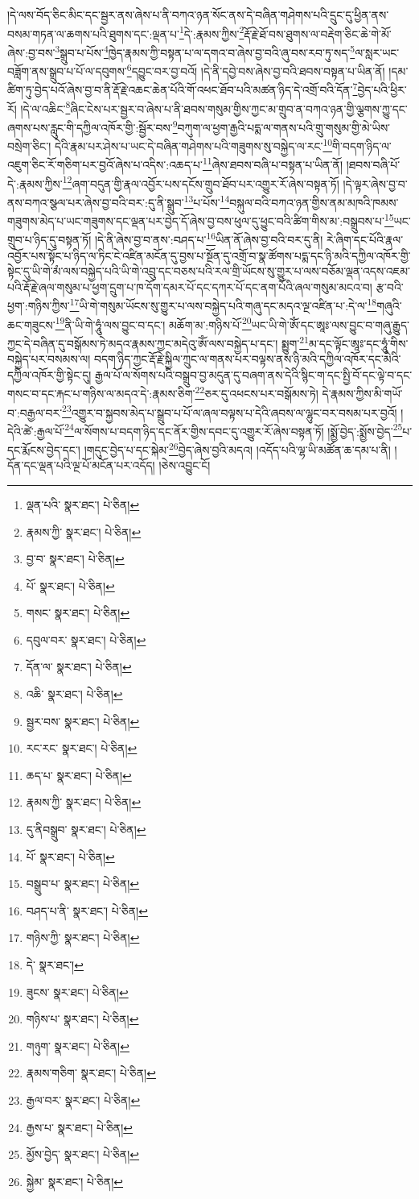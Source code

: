 །དེ་ལས་བོད་ཅིང་མིང་དང་སྦྱར་ནས་ཞེས་པ་ནི་བཀའ་ཉན་སོང་ནས་དེ་བཞིན་གཤེགས་པའི་དྲུང་དུ་ཕྱིན་ནས་བསམ་གཏན་ལ་ཆགས་པའི་ཐུགས་དང་:ལྡན་པ་\footnote{ལྡན་པའི་  སྣར་ཐང་།  པེ་ཅིན། }དེ་:རྣམས་ཀྱིས་\footnote{རྣམས་ཀྱི་  སྣར་ཐང་།  པེ་ཅིན། }རྡོ་རྗེ་ཐོ་བས་ཐུགས་ལ་བརྡེག་ཅིང་ཆེ་གེ་མོ་ཞེས་:བྱ་བས་\footnote{བྱ་བ་  སྣར་ཐང་།  པེ་ཅིན། }སྒྲུབ་པ་པོས་\footnote{པོ་  སྣར་ཐང་།  པེ་ཅིན། }ཁྱེད་རྣམས་ཀྱི་བསྟན་པ་ལ་དགའ་བ་ཞེས་བྱ་བའི་ཞུ་བས་རབ་ཏུ་སད་\footnote{གསང་  སྣར་ཐང་།  པེ་ཅིན། }ལ་སླར་ཡང་བཟློག་ནས་སྒྲུབ་པ་པོ་ལ་དབུགས་\footnote{དབུལ་བར་  སྣར་ཐང་།  པེ་ཅིན། }དབྱུང་བར་བྱ་བའོ། །དེ་ནི་དབྱེ་བས་ཞེས་བྱ་བའི་ཐབས་བསྟན་པ་ཡིན་ནོ། །དམ་ཚིག་ཏུ་བྱེད་པའོ་ཞེས་བྱ་བ་ནི་རྡོ་རྗེ་འཆང་ཆེན་པོའི་གོ་འཕང་ཐོབ་པའི་མཚན་ཉིད་དེ་འགྲོ་བའི་དོན་\footnote{དོན་ལ་  སྣར་ཐང་།  པེ་ཅིན། }བྱེད་པའི་ཕྱིར་རོ། །དེ་ལ་འཆིང་\footnote{འཆི་  སྣར་ཐང་།  པེ་ཅིན། }ཞིང་ངེས་པར་སྦྱར་བ་ཞེས་པ་ནི་ཐབས་གསུམ་གྱིས་ཀྱང་མ་གྲུབ་ན་བཀའ་ཉན་གྱི་ལྕགས་ཀྱུ་དང་ཞགས་པས་རླུང་གི་དཀྱིལ་འཁོར་གྱི་:སྦྱོར་བས་\footnote{སྦྱར་བས་  སྣར་ཐང་།  པེ་ཅིན། }བཀུག་ལ་ཕྱག་རྒྱའི་པདྨ་ལ་གནས་པའི་གྲུ་གསུམ་གྱི་མེ་ཡིས་བསྲེག་ཅིང་། དེའི་རྣམ་པར་ཤེས་པ་ཡང་དེ་བཞིན་གཤེགས་པའི་གཟུགས་སུ་བསྐྱེད་ལ་རང་\footnote{རང་རང་  སྣར་ཐང་།  པེ་ཅིན། }གི་བདག་ཉིད་ལ་འཇུག་ཅིང་རོ་གཅིག་པར་བྱའོ་ཞེས་པ་འདིས་:འཆད་པ་\footnote{ཆད་པ་  སྣར་ཐང་།  པེ་ཅིན། }ཞེས་ཐབས་བཞི་པ་བསྟན་པ་ཡིན་ནོ། །ཐབས་བཞི་པོ་དེ་:རྣམས་ཀྱིས་\footnote{རྣམས་ཀྱི་  སྣར་ཐང་།  པེ་ཅིན། }ཞག་བདུན་གྱི་རྣལ་འབྱོར་པས་དངོས་གྲུབ་ཐོབ་པར་འགྱུར་རོ་ཞེས་བསྟན་ཏོ། །དེ་ལྟར་ཞེས་བྱ་བ་ནས་བཀའ་སྩལ་པར་ཞེས་བྱ་བའི་བར་:དུ་ནི་སྒྲུབ་\footnote{དུ་ནིབསྒྲུབ་  སྣར་ཐང་།  པེ་ཅིན། }པ་པོས་\footnote{པོ་  སྣར་ཐང་།  པེ་ཅིན། }བསྐུལ་བའི་བཀའ་ཉན་གྱིས་ནམ་མཁའི་ཁམས་གཟུགས་མེད་པ་ཡང་གཟུགས་དང་ལྡན་པར་བྱེད་དོ་ཞེས་བྱ་བས་ཕུལ་དུ་ཕྱུང་བའི་ཚིག་གིས་མ་:བསྒྲུབས་པ་\footnote{བསྒྲུབ་པ་  སྣར་ཐང་།  པེ་ཅིན། }ཡང་གྲུབ་པ་ཉིད་དུ་བསྟན་ཏོ། །དེ་ནི་ཞེས་བྱ་བ་ནས་:བཤད་པ་\footnote{བཤད་པ་ནི་  སྣར་ཐང་།  པེ་ཅིན། }ཡིན་ནོ་ཞེས་བྱ་བའི་བར་དུ་ནི། རེ་ཞིག་དང་པོའི་རྣལ་འབྱོར་པས་སྟོང་པ་ཉིད་ལ་ཏིང་ངེ་འཛིན་མངོན་དུ་བྱས་པ་སྔོན་དུ་འགྲོ་བ་སྣ་ཚོགས་པདྨ་དང་ཉི་མའི་དཀྱིལ་འཁོར་གྱི་སྟེང་དུ་ཡི་གེ་མཾ་ལས་བསྐྱེད་པའི་ཡི་གེ་འབྲུ་དང་བཅས་པའི་རལ་གྲི་ཡོངས་སུ་གྱུར་པ་ལས་བཅོམ་ལྡན་འདས་འཇམ་པའི་རྡོ་རྗེ་ཞལ་གསུམ་པ་ཕྱག་དྲུག་པ་ཁ་དོག་དམར་པོ་དང་དཀར་པོ་དང་ནག་པོའི་ཞལ་གསུམ་མངའ་བ། རྩ་བའི་ཕྱག་:གཉིས་ཀྱིས་\footnote{གཉིས་ཀྱི་  སྣར་ཐང་།  པེ་ཅིན། }ཡི་གེ་གསུམ་ཡོངས་སུ་གྱུར་པ་ལས་བསྐྱེད་པའི་གཞུ་དང་མདའ་ལྔ་འཛིན་པ་:དེ་ལ་\footnote{དེ་  སྣར་ཐང་། }གཞུའི་ཆང་གཟུངས་\footnote{ཟུངས་  སྣར་ཐང་།  པེ་ཅིན། }ནི་ཡི་གེ་ཧཱུཾ་ལས་བྱུང་བ་དང་། མཆོག་མ་:གཉིས་པོ་\footnote{གཉིས་པ་  སྣར་ཐང་།  པེ་ཅིན། }ཡང་ཡི་གེ་ཨོཾ་དང་ཨཱཿ་ལས་བྱུང་བ་གཞུ་རྒྱུད་ཀྱང་དེ་བཞིན་དུ་བསྒོམས་ཏེ་མདའ་རྣམས་ཀྱང་མདེའུ་ཨོཾ་ལས་བསྐྱེད་པ་དང་། སྨྱུག་\footnote{གཉུག་  སྣར་ཐང་།  པེ་ཅིན། }མ་དང་ལྟོང་ཨཱཿ་དང་ཧཱུཾ་གིས་བསྐྱེད་པར་བསམས་ལ། བདག་ཉིད་ཀྱང་རྡོ་རྗེ་སྐྱིལ་ཀྲུང་ལ་གནས་པར་བལྟས་ནས་ཉི་མའི་དཀྱིལ་འཁོར་དང་མེའི་དཀྱིལ་འཁོར་གྱི་སྟེང་དུ། རྒྱལ་པོ་ལ་སོགས་པའི་བསྒྲུབ་བྱ་མདུན་དུ་བཞག་ནས་དེའི་སྙིང་ག་དང་སྤྱི་བོ་དང་ལྟེ་བ་དང་གསང་བ་དང་རྐང་པ་གཉིས་ལ་མདའ་དེ་:རྣམས་ཅིག་\footnote{རྣམས་གཅིག་  སྣར་ཐང་།  པེ་ཅིན། }ཅར་དུ་འཕངས་པར་བསྒོམས་ཏེ། དེ་རྣམས་ཀྱིས་མི་གཡོ་བ་:བརྒྱལ་བར་\footnote{རྒྱལ་བར་  སྣར་ཐང་།  པེ་ཅིན། }འགྱུར་བ་སྐྱབས་མེད་པ་སྒྲུབ་པ་པོ་ལ་ཞལ་བལྟས་པ་དེའི་ཞབས་ལ་ལྷུང་བར་བསམ་པར་བྱའོ། །དེའི་ཚེ་:རྒྱལ་པོ་\footnote{རྒྱས་པ་  སྣར་ཐང་།  པེ་ཅིན། }ལ་སོགས་པ་བདག་ཉིད་དང་ནོར་གྱིས་དབང་དུ་འགྱུར་རོ་ཞེས་བསྟན་ཏོ། །སྨྱོ་བྱེད་:སྨྱོས་བྱེད་\footnote{མྱོས་བྱེད་  སྣར་ཐང་།  པེ་ཅིན། }པ་དང་རྨོངས་བྱེད་དང་། །གདུང་བྱེད་པ་དང་སྐེམ་\footnote{སྐྱེམ་  སྣར་ཐང་།  པེ་ཅིན། }བྱེད་ཞེས་བྱའི་མདའ། །འདོད་པའི་ལྷ་ཡི་མཚོན་ཆ་དམ་པ་ནི། །དོན་དང་ལྡན་པའི་ལྔ་པོ་མངོན་པར་འདོད། །ཅེས་འབྱུང་ངོ། 
